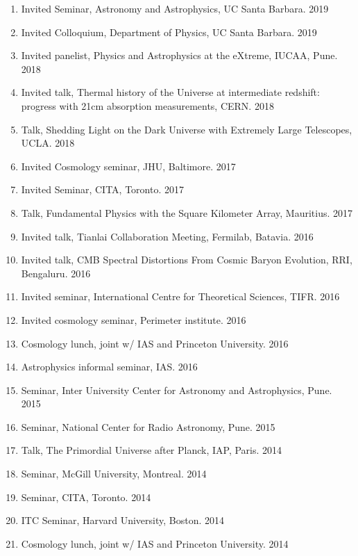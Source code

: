 \documentclass{article}
\newlength{\cvindent}
\newenvironment{cvlist}{%
  \begin{list}{}{%
    \setlength{\leftmargin}{\cvindent}%
    \setlength{\rightmargin}{0pt}%
    \setlength{\topsep}{0pt}%
    \setlength{\partopsep}{0pt}%
    \setlength{\parsep}{0pt}%
    \setlength{\itemsep}{0pt}%
  }%
  \item\relax
}{%
  \end{list}
}
\begin{document}
\begin{cvlist}
\begin{enumerate}
	       \item Invited Seminar, Astronomy and Astrophysics, UC Santa Barbara. \hfill 2019
	       \item Invited Colloquium, Department of Physics, UC Santa Barbara. \hfill 2019
	       \item Invited panelist, Physics and Astrophysics at the eXtreme, IUCAA, Pune. \hfill 2018
	       \item Invited talk, Thermal history of the Universe at intermediate redshift: progress with 21cm absorption measurements, CERN. \hfill 2018
	       \item Talk, Shedding Light on the Dark Universe with Extremely Large Telescopes, UCLA. \hfill 2018
               \item Invited Cosmology seminar, JHU, Baltimore. \hfill 2017
               \item Invited Seminar, CITA, Toronto. \hfill 2017
               \item Talk, Fundamental Physics with the Square Kilometer Array, Mauritius. \hfill 2017
	       \item Invited talk, Tianlai Collaboration Meeting, Fermilab, Batavia. \hfill 2016
               \item Invited talk, CMB Spectral Distortions From Cosmic Baryon Evolution, RRI, Bengaluru. \hfill 2016
               \item Invited seminar, International Centre for Theoretical Sciences, TIFR. \hfill 2016
	       \item Invited cosmology seminar, Perimeter institute. \hfill 2016
	       \item Cosmology lunch, joint w/ IAS and Princeton University. \hfill 2016
               \item Astrophysics informal seminar, IAS. \hfill 2016
	       \item Seminar, Inter University Center for Astronomy and Astrophysics, Pune. \hfill 2015
	       \item Seminar, National Center for Radio Astronomy, Pune. \hfill 2015
	       \item Talk, The Primordial Universe after Planck, IAP, Paris. \hfill 2014
               \item Seminar, McGill University, Montreal. \hfill 2014 
	       \item Seminar, CITA, Toronto. \hfill 2014 
	       \item ITC Seminar, Harvard University, Boston. \hfill 2014
	       \item Cosmology lunch, joint w/ IAS and Princeton University. \hfill 2014

\end{enumerate}
\end{cvlist}
\end{document}
